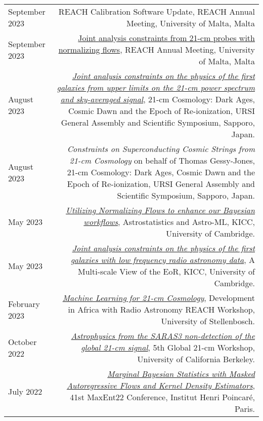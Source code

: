 \documentclass{article}
\begin{document}
\begin{tabular}{L!{\vrule}R}
    September 2023 & REACH Calibration Software Update, REACH Annual Meeting, University of Malta, Malta \\
    September 2023 & \href{https://github.com/htjb/Talks/tree/master/Talks/REACH_Malta/joint_analysis_margarine.pdf}{Joint analysis constraints from 21-cm probes with normalizing flows}, REACH Annual Meeting, University of Malta, Malta \\
    August 2023 & \href{https://github.com/htjb/Talks/raw/master/Talks/URSI_2023/joint_analysis_margarine.pdf}{\textit{Joint analysis constraints on the physics of the first galaxies from upper limits on the 21-cm power spectrum and sky-averaged signal}}, 21-cm Cosmology: Dark Ages, Cosmic Dawn and the Epoch of Re-ionization, URSI General Assembly and Scientific Symposium, Sapporo, Japan. \\
    August 2023 & \textit{Constraints on Superconducting Cosmic Strings from 21-cm Cosmology} on behalf of Thomas Gessy-Jones, 21-cm Cosmology: Dark Ages, Cosmic Dawn and the Epoch of Re-ionization, URSI General Assembly and Scientific Symposium, Sapporo, Japan. \\
    May 2023 & \href{https://github.com/htjb/Talks/blob/master/Talks/KICC_EoR/Bevins_KICC_EoR.pdf}{\textit{Utilizing Normalizing Flows to enhance our Bayesian workflows}}, Astrostatistics and Astro-ML, KICC, University of Cambridge. \\
    May 2023 & \href{https://github.com/htjb/Talks/blob/master/Talks/KICC_EoR/Bevins_KICC_EoR.pdf}{\textit{Joint analysis constraints on the physics of the first galaxies with low frequency radio astronomy data}}, A Multi-scale View of the EoR, KICC, University of Cambridge. \\
    February 2023 & \href{https://github.com/htjb/Talks/blob/master/Talks/DARA_REACH_Workshop/DARA_Workshop.pdf}{\textit{Machine Learning for 21-cm Cosmology}}, Development in Africa with Radio Astronomy REACH Workshop, University of Stellenbosch. \\
    October 2022 & \href{https://global21cmworkshop.org/2022-berkeley/}{\textit{Astrophysics from the SARAS3 non-detection of the global 21-cm signal}}, 5th Global 21-cm Workshop, University of California Berkeley. \\
	July 2022 & \href{https://github.com/htjb/Talks/blob/master/Talks/MaxEnt22_margarine_June_2022/MaxEnt_slides.pdf}{\textit{Marginal Bayesian Statistics with Masked Autoregressive Flows and Kernel Density Estimators}}, 41st MaxEnt22 Conference, Institut Henri Poincar\'e, Paris. \\

\end{tabular}
\end{document}
